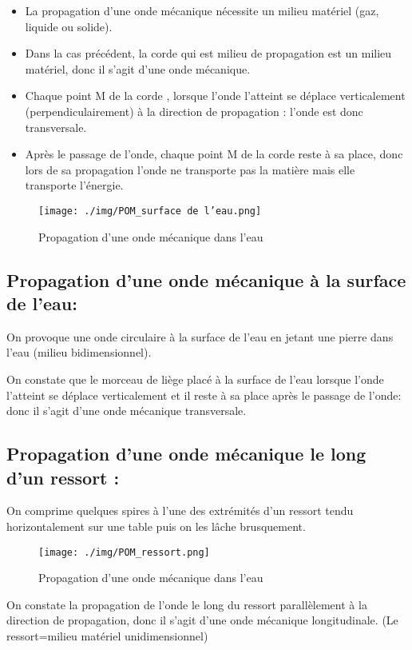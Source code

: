 \documentclass[12pt]{article}
\begin{document}
\begin{itemize}
	\item La propagation d'une onde mécanique nécessite un milieu matériel (gaz, liquide ou solide).
	\item Dans la cas précédent, la corde qui est milieu de propagation est un milieu matériel, donc il s'agit d'une onde mécanique.
	\item Chaque point M de la corde , lorsque l'onde l'atteint se déplace verticalement (perpendiculairement) à la direction de
propagation : l'onde est donc transversale.
\item Après le passage de l'onde, chaque point M de la corde reste à sa place, donc lors de sa propagation l'onde ne transporte pas la
matière mais elle transporte l'énergie.

\end{itemize}

\begin{wrapfigure}[4]{r}{0.2\textwidth}	
	\vspace{-2cm}
	\texttt{[image: ./img/POM\_surface de l'eau.png]}
	\caption{Propagation d'une onde mécanique dans l'eau}
\end{wrapfigure}
\subsection{Propagation d'une onde mécanique à la surface de l'eau:}
On provoque une onde circulaire à la surface de l'eau en jetant une pierre dans l'eau (milieu bidimensionnel).

On constate que le morceau de liège placé à la surface de l'eau lorsque l'onde l'atteint se déplace verticalement et il reste à sa
place après le passage de l'onde: donc il s'agit d'une onde mécanique transversale.

\subsection{Propagation d'une onde mécanique le long d'un ressort :}

On comprime quelques spires à l'une des extrémités d'un ressort tendu horizontalement sur une table puis on les lâche brusquement.

\begin{wrapfigure}[4]{r}{0.3\textwidth}	
	\caption{Propagation d'une onde mécanique dans l'eau}
	\texttt{[image: ./img/POM\_ressort.png]}
\end{wrapfigure}
On constate la propagation de l'onde le long du ressort parallèlement à la direction de propagation, donc il s'agit d'une onde
mécanique longitudinale. (Le ressort=milieu matériel unidimensionnel)
\end{document}
